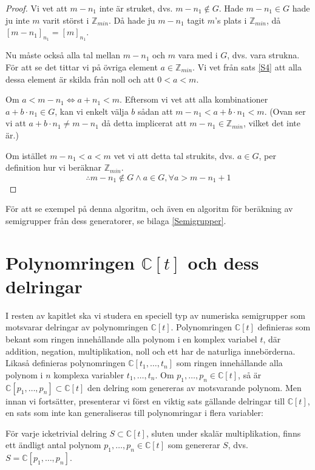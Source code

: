 \begin{enumerate}
\begin{proof}
Vi vet att $m-n_1$ inte är struket, dvs. $m-n_1 \notin G$. Hade $m-n_1 \in G$ hade ju inte $m$ varit störst i $\mathbb{Z}_{min}$. Då hade ju $m-n_1$ tagit $m$'s plats i $\mathbb{Z}_{min}$, då $[m-n_1]_{n_1} = [m]_{n_1}$.

Nu måste också alla tal mellan $m-n_1$ och $m$ vara med i $G$, dvs. vara strukna. För att se det tittar vi på övriga element $a \in \mathbb{Z}_{min}$. Vi vet från sats \ref{S4} att alla dessa element är skilda från noll och att $0 < a < m$.

Om $a < m-n_1 \Longleftrightarrow a+n_1<m$. Eftersom vi vet att alla kombinationer $a+b\cdot n_1 \in G$, kan vi enkelt välja $b$ sådan att $m-n_1 < a+b\cdot n_1 < m$. (Ovan ser vi att $a+b\cdot n_1 \neq m-n_1$ då detta implicerat att $m-n_1 \in \mathbb{Z}_{min}$, vilket det inte är.)

Om istället $m-n_1 < a < m$ vet vi att detta tal strukits, dvs. $a \in G$, per definition hur vi beräknar $\mathbb{Z}_{min}$.
\[\therefore m-n_1 \notin G \wedge a \in G, \forall a > m-n_1+1\]
\end{proof}
\end{enumerate}

För att se exempel på denna algoritm, och även en algoritm för beräkning av semigrupper från dess generatorer, se bilaga \ref{Semigrupper}.

\section{Polynomringen $\mathbb{C}[t]$ och dess delringar}

I resten av kapitlet ska vi studera en speciell typ av numeriska semigrupper som motsvarar delringar av polynomringen $\mathbb{C}[t]$. Polynomringen $\mathbb{C}[t]$ definieras som bekant som ringen innehållande alla polynom i en komplex variabel $t$, där addition, negation, multiplikation, noll och ett har de naturliga innebörderna. Likaså definieras polynomringen $\mathbb{C}[t_1,\ldots,t_n]$ som ringen innehållande alla polynom i $n$ komplexa variabler $t_1,\ldots,t_n$. Om $p_1,\ldots,p_n \in \mathbb{C}[t]$, så är $\mathbb{C}[p_1,\ldots,p_n] \subset \mathbb{C}[t]$ den delring som genereras av motsvarande polynom. Men innan vi fortsätter, presenterar vi först en viktig sats gällande delringar till $\mathbb{C}[t]$, en sats som inte kan generaliseras till polynomringar i flera variabler:

\begin{Theorem}
\label{FinitelyGenerated}
För varje icketrivial delring $S \subset \mathbb{C}[t]$, sluten under skalär multiplikation, finns ett ändligt antal polynom $p_1,\ldots,p_n \in \mathbb{C}[t]$ som genererar $S$, dvs. $S=\mathbb{C}[p_1,\ldots,p_n]$.
\end{Theorem}

